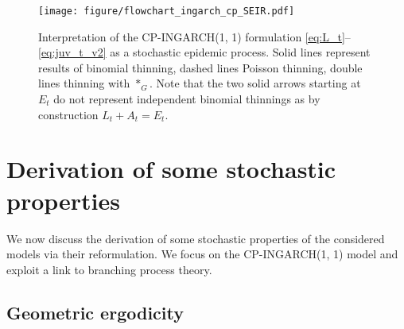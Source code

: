 \documentclass{article}
\begin{document}
\begin{figure}[h!]
\center
\texttt{[image: figure/flowchart\_ingarch\_cp\_SEIR.pdf]}
\caption{Interpretation of the CP-INGARCH(1, 1) formulation \eqref{eq:L_t}--\eqref{eq:juv_t_v2} as a stochastic epidemic process. Solid lines represent results of binomial thinning, dashed lines Poisson thinning, double lines thinning with $*_G$. Note that the two solid arrows starting at $E_t$ do not represent independent binomial thinnings as by construction  $L_t + A_t = E_t$.}
\label{fig:ingarch_flowchart}
\end{figure}



\section{Derivation of some stochastic properties}

We now discuss the derivation of some stochastic properties of the considered models via their reformulation. We focus on the CP-INGARCH(1, 1) model and exploit a link to branching process theory.

\subsection{Geometric ergodicity}
\end{document}
